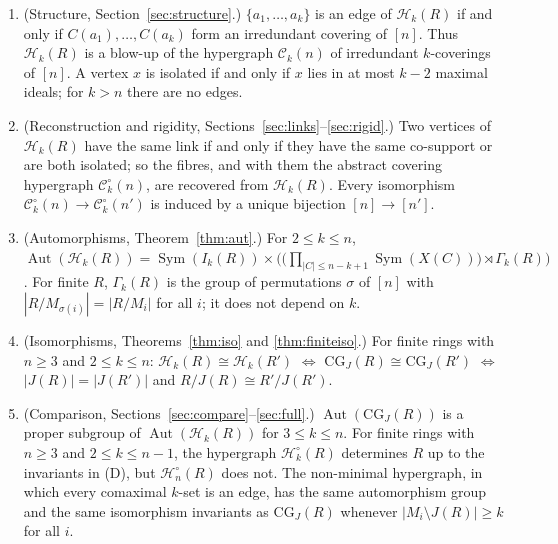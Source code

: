 \documentclass{amsart}
\theoremstyle{definition}
\theoremstyle{remark}
\newcommand{\Aut}{\operatorname{Aut}}
\newcommand{\Sym}{\operatorname{Sym}}
\newcommand{\CG}{\mathrm{CG}_J}
\newcommand{\cC}{\mathcal{C}}
\newcommand{\cH}{\mathcal{H}}
\newcommand{\nn}{[n]}
\begin{document}
\begin{enumerate}
\item[(A)] (Structure, Section~\ref{sec:structure}.) $\{a_1,\dots,a_k\}$ is an edge of $\cH_k(R)$ if and only if $C(a_1),\dots,C(a_k)$ form an irredundant covering of $\nn$. Thus $\cH_k(R)$ is a blow-up of the hypergraph $\cC_k(n)$ of irredundant $k$-coverings of $\nn$. A vertex $x$ is isolated if and only if $x$ lies in at most $k-2$ maximal ideals; for $k>n$ there are no edges.
\item[(B)] (Reconstruction and rigidity, Sections~\ref{sec:links}--\ref{sec:rigid}.) Two vertices of $\cH_k(R)$ have the same link if and only if they have the same co-support or are both isolated; so the fibres, and with them the abstract covering hypergraph $\cC_k^{\circ}(n)$, are recovered from $\cH_k(R)$. Every isomorphism $\cC_k^{\circ}(n)\to\cC_k^{\circ}(n')$ is induced by a unique bijection $\nn\to[n']$.
\item[(C)] (Automorphisms, Theorem~\ref{thm:aut}.) For $2\le k\le n$, $\Aut(\cH_k(R))=\Sym(I_k(R))\times\bigl(\bigl(\prod_{|C|\le n-k+1}\Sym(X(C))\bigr)\rtimes\Gamma_k(R)\bigr)$. For finite $R$, $\Gamma_k(R)$ is the group of permutations $\sigma$ of $\nn$ with $|R/M_{\sigma(i)}|=|R/M_i|$ for all $i$; it does not depend on $k$.
\item[(D)] (Isomorphisms, Theorems~\ref{thm:iso} and \ref{thm:finiteiso}.) For finite rings with $n\ge 3$ and $2\le k\le n$: $\cH_k(R)\cong\cH_k(R')$ $\iff$ $\CG(R)\cong\CG(R')$ $\iff$ $|J(R)|=|J(R')|$ and $R/J(R)\cong R'/J(R')$.
\item[(E)] (Comparison, Sections~\ref{sec:compare}--\ref{sec:full}.) $\Aut(\CG(R))$ is a proper subgroup of $\Aut(\cH_k(R))$ for $3\le k\le n$. For finite rings with $n\ge3$ and $2\le k\le n-1$, the hypergraph $\cH_k^{\circ}(R)$ determines $R$ up to the invariants in (D), but $\cH_n^{\circ}(R)$ does not. The non-minimal hypergraph, in which every comaximal $k$-set is an edge, has the same automorphism group and the same isomorphism invariants as $\CG(R)$ whenever $|M_i\setminus J(R)|\ge k$ for all $i$.
\end{enumerate}
\end{document}
